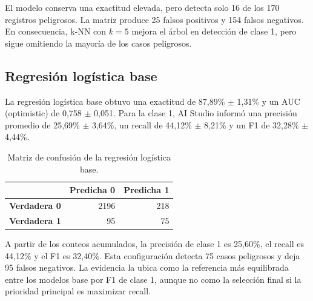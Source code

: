 \documentclass[12pt,a4paper]{article}
\begin{document}
El modelo conserva una exactitud elevada, pero detecta solo 16 de los 170 registros peligrosos. La matriz produce 25 falsos positivos y 154 falsos negativos. En consecuencia, k-NN con $k=5$ mejora el árbol en detección de clase 1, pero sigue omitiendo la mayoría de los casos peligrosos.

\subsection{Regresión logística base}
La regresión logística base obtuvo una exactitud de 87,89\% $\pm$ 1,31\% y un AUC (optimistic) de 0,758 $\pm$ 0,051. Para la clase 1, AI Studio informó una precisión promedio de 25,69\% $\pm$ 3,64\%, un recall de 44,12\% $\pm$ 8,21\% y un F1 de 32,28\% $\pm$ 4,44\%.

\begin{table}[H]
\centering
\caption{Matriz de confusión de la regresión logística base.}
\label{tab:logistic-matrix}
\begin{tabular}{lrr}
\toprule
 & \textbf{Predicha 0} & \textbf{Predicha 1} \\
\midrule
\textbf{Verdadera 0} & 2196 & 218 \\
\textbf{Verdadera 1} & 95 & 75 \\
\bottomrule
\end{tabular}
\end{table}

A partir de los conteos acumulados, la precisión de clase 1 es 25,60\%, el recall es 44,12\% y el F1 es 32,40\%. Esta configuración detecta 75 casos peligrosos y deja 95 falsos negativos. La evidencia la ubica como la referencia más equilibrada entre los modelos base por F1 de clase 1, aunque no como la selección final si la prioridad principal es maximizar recall.

\begin{table}[H]
\centering
\caption{Comparación final de los cuatro modelos base.}
\label{tab:base-model-comparison}
\small
{}
\end{table}
\end{document}

